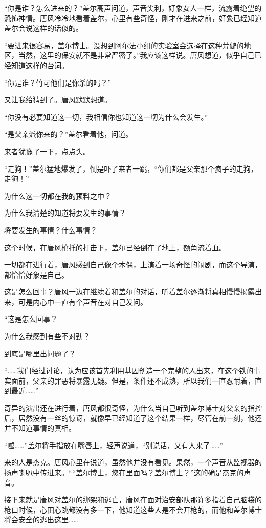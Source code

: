 “你是谁？怎么进来的？”盖尔高声问道，声音尖利，好象女人一样，流露着绝望的恐怖神情。唐风冷冷地看着盖尔，心里有些奇怪，刚才在进来之前，好象已经知道盖尔会说这样的话似的。 

“要进来很容易，盖尔博士。没想到阿尔法小组的实验室会选择在这种荒僻的地区，当然，这里的保安就不是非常严密了。”我应该这样说。唐风想道，似乎自己已经知道这样的台词。 

“你是谁？竹可他们是你杀的吗？” 

又让我给猜到了。唐风默默想道。 

“你没有必要知道这一切，我相信你也知道这一切为什么会发生。” 

“是父亲派你来的？”盖尔看着他，问道。 

来者犹豫了一下，点点头。 

“走狗！”盖尔猛地爆发了，倒是吓了来者一跳，“你们都是父亲那个疯子的走狗，走狗！” 

为什么这一切都在我的预料之中？ 

为什么我清楚的知道将要发生的事情？ 

将要发生的事情？什么事情？ 

这个时候，在唐风枪托的打击下，盖尔已经倒在了地上，额角流着血。 

一切都在进行着，唐风感到自己像个木偶，上演着一场奇怪的闹剧，而这个导演，都恰恰好象是自己。 

这是怎么回事？唐风一边在继续着和盖尔的对话，听着盖尔逐渐将真相慢慢揭露出来，可是内心中一直有个声音在对自己发问。 

“这是怎么回事？ 

为什么我感到有些不对劲？ 

到底是哪里出问题了？ 

“……我们经过讨论，认为应该首先利用基因创造一个完整的人出来，在这个铁的事实面前，父亲的罪恶将暴露无疑。但是，条件还不成熟，所以我们一直忍耐着，直到最近……” 

奇异的演出还在进行着，唐风都很奇怪，为什么当自己听到盖尔博士对父亲的指控后，居然没有一丝的惊讶，就像早已经知道了这个结果一样，尽管在前一刻，他还并不知道事情的真相。 

“嘘……”盖尔将手指放在嘴唇上，轻声说道，“别说话，又有人来了……” 

来的人是杰克。唐风心里在说道，虽然他并没有看见。果然，一个声音从监视器的扬声喇叭中传进来。““盖尔博士，您在里面吗？盖尔博士？”这的确是杰克的声音。 

接下来就是唐风对盖尔的绑架和逃亡，唐风在面对治安部队那许多指着自己脑袋的枪口时候，心田心跳都没有多一下，他知道这些人是不会开枪的，而他和盖尔博士将会安全的逃出这里…… 

